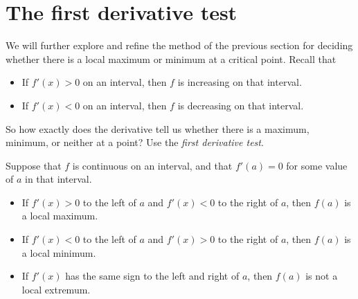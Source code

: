 \documentclass{ximera}
\begin{document}
\section{The first derivative test}

We will further explore and refine the method of the previous section for deciding whether there is a
local maximum or minimum at a critical point.
 Recall that
\begin{itemize}
\item If $f'(x) >0$ on an interval, then $f$ is increasing on that interval.
\item If $f'(x) <0$ on an interval, then $f$ is decreasing on that interval.
\end{itemize}

So how exactly does the derivative tell us whether there is a maximum,
minimum, or neither at a point? Use the \textit{first derivative test}.

\begin{theorem}\label{T:fdt}
Suppose that $f$ is continuous on an interval, and that $f'(a)=0$ for
some value of $a$ in that interval.
\begin{itemize}
\item If $f'(x)>0$ to the left of $a$ and $f'(x)<0$ to the right of
  $a$, then $f(a)$ is a local maximum.
\item If $f'(x)<0$ to the left of $a$ and $f'(x)>0$ to the right of
  $a$, then $f(a)$ is a local minimum.
\item If $f'(x)$ has the same sign to the left and right of $a$,
  then $f(a)$ is not a local extremum.
\end{itemize}
\end{theorem}
\end{document}
